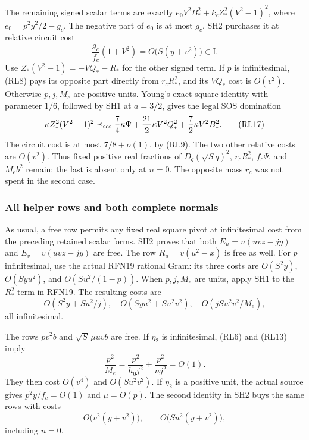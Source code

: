 The remaining signed scalar terms are exactly
\(e_0V^2B_*^2+k_cZ_*^2(V^2-1)^2\), where
\(e_0=p^2y^2/2-g_c\).
The negative part of \(e_0\) is at most \(g_c\).
SH2 purchases it at relative circuit cost
\[
 \frac{g_c}{f_c}(1+V^2)
   =O\bigl(S(y+v^2)\bigr)\in\mathrm I.                \tag{RL16}
\]
Use \(Z_*(V^2-1)=-VQ_*-R_*\) for the other signed term.
If \(p\) is infinitesimal, (RL8) pays its opposite part
directly from \(r_cR_*^2\), and its \(VQ_*\) cost is
\(O(v^2)\).
Otherwise \(p,j,M_e\) are positive units.  Young's exact
square identity with parameter \(1/6\), followed by SH1 at
\(a=3/2\), gives the legal SOS domination
\[
 \kappa Z_*^2(V^2-1)^2
 \preceq_{\rm sos}
 \frac74\kappa\Psi+
 \frac{21}{2}\kappa V^2Q_*^2+
 \frac72\kappa V^2B_*^2 .                             \tag{RL17}
\]
The circuit cost is at most \(7/8+o(1)\), by (RL9).
The two other relative costs are \(O(v^2)\).
Thus fixed positive real fractions of \(D_q(\sqrt S q)^2\),
\(r_cR_*^2\), \(f_c\Psi\), and \(M_eb^2\) remain;
the last is absent only at \(n=0\).
The opposite mass \(r_c\) was not spent in the second case.

\subsubsection*{All helper rows and both complete normals}

As usual, a free row permits any fixed real square pivot at
infinitesimal cost from the preceding retained scalar forms.
SH2 proves that both \(E_u=u(uvz-jy)\) and \(E_v=v(uvz-jy)\)
are free.  The row \(R_u=v(u^2-x)\) is free as well.
For \(p\) infinitesimal, use the actual RFN19 rational Gram:
its three costs are \(O(S^2y)\), \(O(Syu^2)\),
and \(O(Su^2/(1-p))\).
When \(p,j,M_e\) are units, apply SH1 to the \(R_*^2\)
term in RFN19.  The resulting costs are
\[
 O(S^2y+Su^2/j),\quad O(Syu^2+Su^2v^2),\quad
 O(jSu^2v^2/M_e),                                    \tag{RL18}
\]
all infinitesimal.

The rows \(pv^2b\) and \(\sqrt S\,\mu uvb\) are free.
If \(\eta_2\) is infinitesimal, (RL6) and (RL13) imply
\[
 \frac{p^2}{M_e}
  =\frac{p^2}{h_0j^2}+\frac{p^2}{nj^2}=O(1).
                                                               \tag{RL19}
\]
They then cost \(O(v^4)\) and \(O(Su^2v^2)\).
If \(\eta_2\) is a positive unit, the actual source gives
\(p^2y/f_c=O(1)\) and \(\mu=O(p)\).
The second identity in SH2 buys the same rows with costs
\[
 O\bigl(v^2(y+v^2)\bigr),\qquad
 O\bigl(Su^2(y+v^2)\bigr),                             \tag{RL20}
\]
including \(n=0\).

